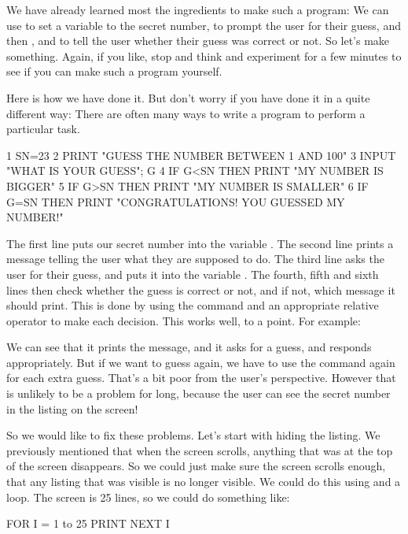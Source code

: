 We have already learned most the ingredients to make such a program: We
can use  to set a variable to the secret number, 
to prompt the user for their guess, and then ,  and
 to tell the user whether their guess was correct or not.
So let's make something. Again, if you like, stop and think and
experiment for a few minutes to see if you can make such a program
yourself.

Here is how we have done it.  But don't worry if you have done it in a
quite different way: There are often many ways to write a program to
perform a particular task.

\begin{screencode}
1 SN=23
2 PRINT "GUESS THE NUMBER BETWEEN 1 AND 100"
3 INPUT "WHAT IS YOUR GUESS"; G
4 IF G<SN THEN PRINT "MY NUMBER IS BIGGER"
5 IF G>SN THEN PRINT "MY NUMBER IS SMALLER"
6 IF G=SN THEN PRINT "CONGRATULATIONS! YOU GUESSED MY NUMBER!"
\end{screencode}

\needspace{4cm}
The first line puts our secret number into the variable .
The second line prints a message telling the user what they are
supposed to do. The third line asks the user for their guess, and puts
it into the variable . The
fourth, fifth and sixth lines then check whether the guess is correct
or not, and if not, which message it should print. This is done by
using the  command and an appropriate relative operator to
make each decision.  This works well, to a point. For example:


We can see that it prints the message, and it asks for a guess, and
responds appropriately. But if we want to guess again, we have to use
the  command again for each extra guess. That's a bit poor
from the user's perspective. However that is unlikely to be a problem
for long, because the user can see the secret number in the listing on
the screen!

So we would like to fix these problems.  Let's start with hiding the
listing.  We previously mentioned that when the screen scrolls,
anything that was at the top of the screen disappears.  So we could
just make sure the screen scrolls enough, that any listing that was
visible is no longer visible. We could do this using  and a
 loop.  The screen is 25 lines, so we could do something
like:

\begin{screencode}
FOR I = 1 to 25
PRINT
NEXT I
\end{screencode}

